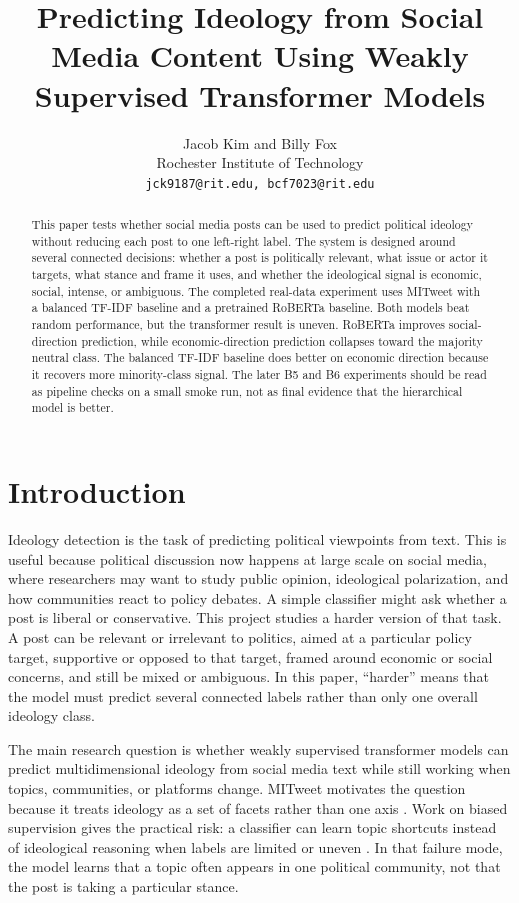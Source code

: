 \documentclass[11pt,twocolumn]{article}
\title{Predicting Ideology from Social Media Content Using Weakly Supervised Transformer Models}
\author{Jacob Kim and Billy Fox \\
  Rochester Institute of Technology \\
  \texttt{jck9187@rit.edu, bcf7023@rit.edu}}
\date{}
\begin{document}
\maketitle

\begin{abstract}
This paper tests whether social media posts can be used to predict political ideology without reducing each post to one left-right label. The system is designed around several connected decisions: whether a post is politically relevant, what issue or actor it targets, what stance and frame it uses, and whether the ideological signal is economic, social, intense, or ambiguous. The completed real-data experiment uses MITweet with a balanced TF-IDF baseline and a pretrained RoBERTa baseline. Both models beat random performance, but the transformer result is uneven. RoBERTa improves social-direction prediction, while economic-direction prediction collapses toward the majority neutral class. The balanced TF-IDF baseline does better on economic direction because it recovers more minority-class signal. The later B5 and B6 experiments should be read as pipeline checks on a small smoke run, not as final evidence that the hierarchical model is better.
\end{abstract}

\section{Introduction}

Ideology detection is the task of predicting political viewpoints from text. This is useful because political discussion now happens at large scale on social media, where researchers may want to study public opinion, ideological polarization, and how communities react to policy debates. A simple classifier might ask whether a post is liberal or conservative. This project studies a harder version of that task. A post can be relevant or irrelevant to politics, aimed at a particular policy target, supportive or opposed to that target, framed around economic or social concerns, and still be mixed or ambiguous. In this paper, ``harder'' means that the model must predict several connected labels rather than only one overall ideology class.

The main research question is whether weakly supervised transformer models can predict multidimensional ideology from social media text while still working when topics, communities, or platforms change. MITweet motivates the question because it treats ideology as a set of facets rather than one axis \cite{liu-etal-2023-ideology}. Work on biased supervision gives the practical risk: a classifier can learn topic shortcuts instead of ideological reasoning when labels are limited or uneven \cite{chen-etal-2023-ideology}. In that failure mode, the model learns that a topic often appears in one political community, not that the post is taking a particular stance.
\end{document}
